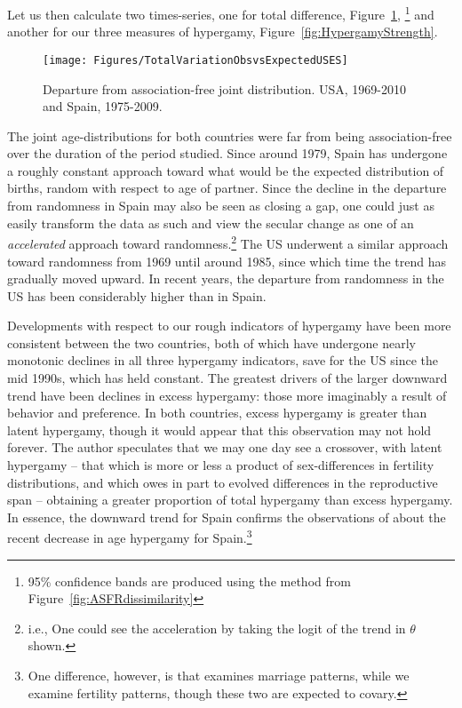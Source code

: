 Let us then calculate two times-series, one for total difference,
Figure~\ref{fig:Theta}, \footnote{95\% confidence bands are produced
    using the method from Figure~\ref{fig:ASFRdissimilarity}} and another for
    our three measures of hypergamy, Figure~\ref{fig:HypergamyStrength}.
\begin{figure}[!ht]
  \centering
    \caption{Departure from association-free joint distribution. USA,
    1969-2010 and Spain, 1975-2009.}
     \texttt{[image: Figures/TotalVariationObsvsExpectedUSES]}
     \label{fig:Theta}
\end{figure}
The joint age-distributions for both countries were far from being
association-free over the duration of the period studied. Since around
1979, Spain has undergone a roughly constant approach toward what would be the
expected distribution of births, random with respect to age of
partner. Since the decline in the departure from randomness in Spain 
may also be seen as closing a gap, one could just as
easily transform the data as such and view the secular change as one of an
\textit{accelerated} approach toward randomness.\footnote{i.e., One could see
the acceleration by taking the logit of the trend in $\theta$ shown.} The US
underwent a similar approach toward randomness from 1969 until around 1985,
since which time the trend has gradually moved upward. In recent years, the
departure from randomness in the US has been considerably higher than in Spain.

Developments with respect to our rough indicators of hypergamy have been more
consistent between the two countries, both of which have undergone nearly
monotonic declines in all three hypergamy indicators, save for the US since the
mid 1990s, which has held constant. The greatest drivers of the larger downward trend
have been declines in excess hypergamy: those more imaginably a result of
behavior and preference. In both countries, excess hypergamy is greater than
latent hypergamy, though it would appear that this observation may not hold forever. The author
 speculates that we may one day see a crossover, with latent hypergamy -- that
which is more or less a product of sex-differences in fertility distributions,
and which owes in part to evolved differences in the reproductive span --
obtaining a greater proportion of total hypergamy than excess hypergamy. In essence, the
downward trend for Spain confirms the observations of \citet{esteve2009long}
about the recent decrease in age hypergamy for Spain.\footnote{One difference,
however, is that \citet{esteve2009long} examines marriage patterns, while we
examine fertility patterns, though these two are expected to covary.}

